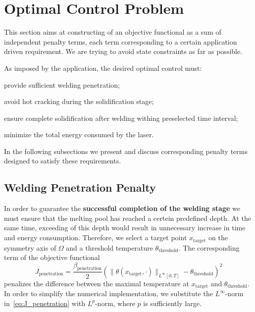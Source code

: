 \section{Optimal Control Problem}
\label{sec:objective}

This section aims at constructing of an objective functional as a sum of independent penalty terms, each term corresponding to a certain application driven requirement.
We are trying to avoid state constraints as far as possible.

As imposed by the application, the desired optimal control must:
\begin{enumeratearabic}
	\item provide sufficient welding penetration;
	\item avoid hot cracking during the solidification stage;
	\item ensure complete solidification after welding withing preselected time interval;
	\item minimize the total energy consumed by the laser.
\end{enumeratearabic}

In the following subsections we present and discuss corresponding penalty terms designed to satisfy these requirements.


\subsection{Welding Penetration Penalty}
\label{subsec:velocity}

In order to guarantee the \textbf{successful completion of the welding stage} we must ensure that the melting pool has reached a certein predefined depth. At the same time, exceeding of this depth would result in unnecessary increase in time and energy consumption. Therefore, we select a target point $x_{\text{target}}$ on the symmetry axis of $\Omega$ and a threshold temperature $\theta_{\text{threshold}}$. The corresponding term of the objective functional
\begin{equation} \label{eq:J_penetration}
	J_{\text{penetration}} = \frac{\beta_\text{penetration}}{2} \left( \| \theta(x_{\text{target}},\cdot) \|_{L^{\infty}[0,T]} - \theta_{\text{threshold}} \right)^2
\end{equation}
penalizes the difference between the maximal temperature at $x_{\text{target}}$ and $\theta_{\text{threshold}}$. In order to simplify the numerical implementation, we substitute the $L^{\infty}$-norm in~\eqref{eq:J_penetration} with $L^{p}$-norm, where $p$ is sufficiently large.


